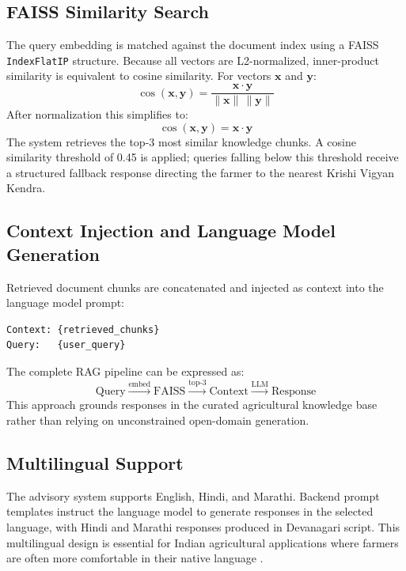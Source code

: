 \documentclass[conference]{IEEEtran}
\begin{document}
\subsection{FAISS Similarity Search}

The query embedding is matched against the document index using a
FAISS \texttt{IndexFlatIP} structure. Because all vectors are
L2-normalized, inner-product similarity is equivalent to cosine
similarity. For vectors $\mathbf{x}$ and $\mathbf{y}$:
\begin{equation}
    \cos(\mathbf{x},\mathbf{y}) =
    \frac{\mathbf{x}\cdot\mathbf{y}}{\|\mathbf{x}\|\,\|\mathbf{y}\|}
\end{equation}
After normalization this simplifies to:
\begin{equation}
    \cos(\mathbf{x},\mathbf{y}) = \mathbf{x}\cdot\mathbf{y}
\end{equation}
The system retrieves the top-3 most similar knowledge chunks. A
cosine similarity threshold of 0.45 is applied; queries falling
below this threshold receive a structured fallback response
directing the farmer to the nearest Krishi Vigyan Kendra.

\subsection{Context Injection and Language Model Generation}

Retrieved document chunks are concatenated and injected as context
into the language model prompt:
\begin{verbatim}
Context: {retrieved_chunks}
Query:   {user_query}
\end{verbatim}
The complete RAG pipeline can be expressed as:
\begin{equation}
\mathrm{Query}
\xrightarrow{\text{embed}}
\mathrm{FAISS}
\xrightarrow{\text{top-3}}
\mathrm{Context}
\xrightarrow{\text{LLM}}
\mathrm{Response}
\end{equation}
This approach grounds responses in the curated agricultural knowledge
base rather than relying on unconstrained open-domain generation.

\subsection{Multilingual Support}

The advisory system supports English, Hindi, and Marathi. Backend
prompt templates instruct the language model to generate responses
in the selected language, with Hindi and Marathi responses produced
in Devanagari script. This multilingual design is essential for
Indian agricultural applications where farmers are often more
comfortable in their native language \cite{chand2012}.
\end{document}
